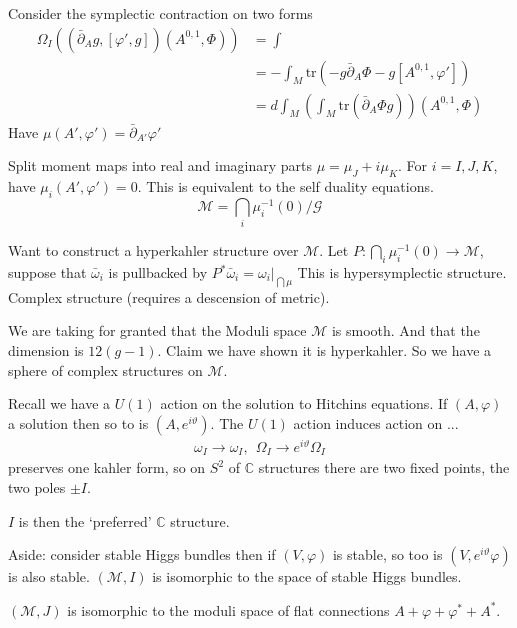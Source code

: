 Consider the symplectic contraction on two forms 
\begin{align}
    \Omega_I ( (\bar{\partial}_A g, [\varphi', g] )( A^{0,1}, \Phi))& = \int \\
    & = - \int_M \mathrm{tr}( - g \bar{\partial} _A \Phi - g [ A^{0,1}, \varphi']) \\
    & = d \int _M \left( \int_M \mathrm{tr}(\bar{\partial}_A \Phi g) \right) ( A^{0,1} , \Phi) 
\end{align}
Have $ \mu(A', \varphi') = \bar{\partial}_{A'} \varphi' $

Split moment maps into real and imaginary parts $ \mu = \mu_J + i \mu_K$.
For $ i = I,J,K$, have $\mu_i ( A', \varphi') = 0 $. 
This is equivalent to the self duality equations.
\begin{equation}
    \mathcal{M} = \bigcap_{i} \mu^{-1}_i (0) / \mathcal{G} 
\end{equation}

Want to construct a hyperkahler structure over $\mathcal{M}$.
Let $ P : \bigcap_i \mu^{-1} _i (0) \rightarrow \mathcal{M} $, 
suppose that $ \bar{\omega}_i $ is pullbacked by $ P^* \bar{\omega}_i = \omega_i |_{\bigcap \mu}$
This is hypersymplectic structure. 
Complex structure (requires a descension of metric). 

We are taking for granted that the Moduli space $\mathcal{M}$ is smooth.
And that the dimension is $ 12(g-1) $. 
Claim we have shown it is hyperkahler. 
So we have a sphere of complex structures on $\mathcal{M} $.

Recall we have a $U(1)$ action on the solution to Hitchins equations. 
If $(A, \varphi)$ a solution then so to is $( A, e^{i \vartheta}) $. 
The $U(1) $ action induces action on ... 
\begin{align}
    \omega_I \rightarrow \omega_I , ~~ \Omega_I \rightarrow  e^{i \vartheta} \Omega_I 
\end{align}
preserves one kahler form, so on $S^2$ of $\mathbb{C} $ structures there are two fixed points, 
the two poles $ \pm I$.

$I$ is then the `preferred' $\mathbb{C} $ structure. 

Aside: consider stable Higgs bundles then if $(V, \varphi) $ is stable, so too is $(V, e^{i\vartheta} \varphi) $ is also stable. 
$( \mathcal{M}, I) $ is isomorphic to the space of stable Higgs bundles.

$(\mathcal{M}, J) $ is isomorphic to the moduli space of flat connections $A + \varphi + \varphi^* +A ^* $.







 

